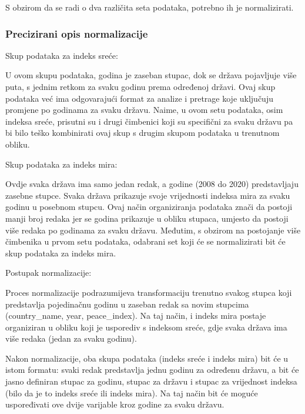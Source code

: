 \documentclass[11pt]{article}
\begin{document}
    S obzirom da se radi o dva različita seta podataka, potrebno ih je
normalizirati.

\hypertarget{precizirani-opis-normalizacije}{%
\subsubsection{Precizirani opis
normalizacije}\label{precizirani-opis-normalizacije}}

Skup podataka za indeks sreće:

U ovom skupu podataka, godina je zaseban stupac, dok se država
pojavljuje više puta, s jednim retkom za svaku godinu prema određenoj
državi. Ovaj skup podataka već ima odgovarajući format za analize i
pretrage koje uključuju promjene po godinama za svaku državu. Naime, u
ovom setu podataka, osim indeksa sreće, prisutni su i drugi čimbenici
koji su specifični za svaku državu pa bi bilo teško kombinirati ovaj
skup s drugim skupom podataka u trenutnom obliku.

Skup podataka za indeks mira:

Ovdje svaka država ima samo jedan redak, a godine (2008 do 2020)
predstavljaju zasebne stupce. Svaka država prikazuje svoje vrijednosti
indeksa mira za svaku godinu u posebnom stupcu. Ovaj način organiziranja
podataka znači da postoji manji broj redaka jer se godina prikazuje u
obliku stupaca, umjesto da postoji više redaka po godinama za svaku
državu. Međutim, s obzirom na postojanje više čimbenika u prvom setu
podataka, odabrani set koji će se normalizirati bit će skup podataka za
indeks mira.

Postupak normalizacije:

Proces normalizacije podrazumijeva transformaciju trenutno svakog stupca
koji predstavlja pojedinačnu godinu u zaseban redak sa novim stupcima
(country\_name, year, peace\_index). Na taj način, i indeks mira postaje
organiziran u obliku koji je usporediv s indeksom sreće, gdje svaka
država ima više redaka (jedan za svaku godinu).

Nakon normalizacije, oba skupa podataka (indeks sreće i indeks mira) bit
će u istom formatu: svaki redak predstavlja jednu godinu za određenu
državu, a bit će jasno definiran stupac za godinu, stupac za državu i
stupac za vrijednost indeksa (bilo da je to indeks sreće ili indeks
mira). Na taj način bit će moguće uspoređivati ove dvije varijable kroz
godine za svaku državu.
\end{document}

